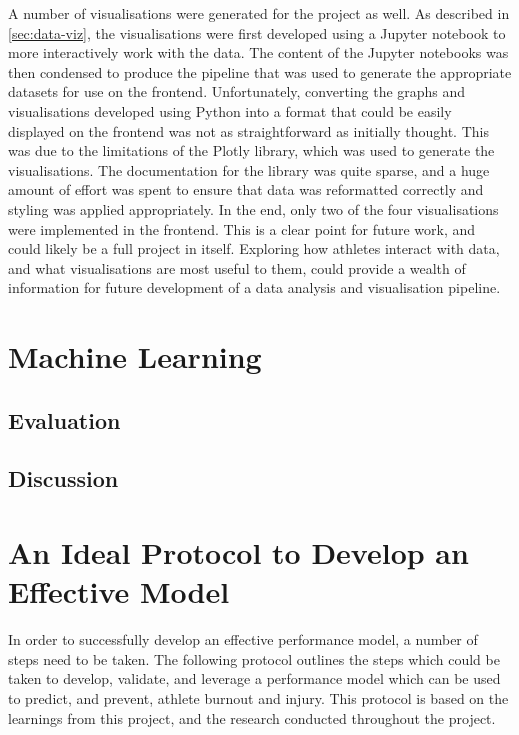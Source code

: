 A number of visualisations were generated for the project as well. As described in \autoref{sec:data-viz}, the visualisations were first developed using a Jupyter notebook to more interactively work with the data. The content of the Jupyter notebooks was then condensed to produce the pipeline that was used to generate the appropriate datasets for use on the frontend. Unfortunately, converting the graphs and visualisations developed using Python into a format that could be easily displayed on the frontend was not as straightforward as initially thought. This was due to the limitations of the Plotly library, which was used to generate the visualisations. The documentation for the library was quite sparse, and a huge amount of effort was spent to ensure that data was reformatted correctly and styling was applied appropriately. In the end, only two of the four visualisations were implemented in the frontend. This is a clear point for future work, and could likely be a full project in itself. Exploring how athletes interact with data, and what visualisations are most useful to them, could provide a wealth of information for future development of a data analysis and visualisation pipeline.

\section{Machine Learning}
\subsection{Evaluation}
\subsection{Discussion}

\section{\label{sec:model-devel-prot}An Ideal Protocol to Develop an Effective Model}
In order to successfully develop an effective performance model, a number of steps need to be taken. The following protocol outlines the steps which could be taken to develop, validate, and leverage a performance model which can be used to predict, and prevent, athlete burnout and injury. This protocol is based on the learnings from this project, and the research conducted throughout the project.


